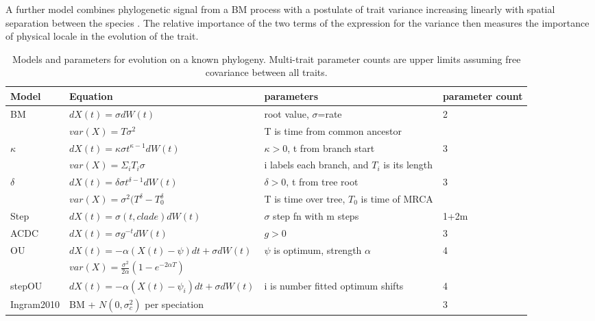 \documentclass[12pt]{article}
\begin{document}
A further model combines phylogenetic signal from a BM process with a postulate of trait variance increasing linearly with spatial separation between the species \citep{freckleton_space_2009}. The relative importance of the two terms of the expression for the variance then measures the importance of physical locale in the evolution of the trait.

\begin{sidewaystable}
\caption{Models and parameters for evolution on a known phylogeny. Multi-trait parameter counts are upper limits assuming free covariance between all traits.}
\begin{tabular}{l l l l}
\hline
Model & Equation & parameters & parameter count 	 \\
\hline
BM              & $dX(t) = \sigma dW(t)$                        & root value, $\sigma$=rate             & 2    		\\ 
		& $var(X) = T \sigma^2$ 			& T is time from common ancestor 	& 		\\
$\kappa$        & $dX(t) = \kappa \sigma t^{\kappa -1} dW(t)$   & $\kappa > 0$, t from branch start     & 3     	\\
		& $var(X) = \Sigma_i T_i \sigma$ 		& i labels each branch, and $T_i$ is its length & 	\\
$\delta$        & $dX(t) = \delta \sigma t^{\delta -1} dW(t)$   & $\delta > 0$, t from tree root        & 3     	\\
		& $var(X) = \sigma^2(T^{\delta} - T_0^{\delta}$ & T is time over tree, $T_0$ is time of MRCA & 		\\ 
Step            & $dX(t) = \sigma(t, clade) dW(t) $             & $\sigma$ step fn with m steps         & 1+2m   	\\
ACDC            & $dX(t) = \sigma g^{-t} dW(t)$                 & $ g > 0 $                             & 3     	\\
OU              & $dX(t) = -\alpha(X(t)-\psi)dt+\sigma dW(t)$    & $\psi$ is optimum, strength $\alpha$  & 4    	\\
		& $var(X) = \frac{\sigma^2}{2\alpha}(1-e^{-2 \alpha T})$ 	& & 					\\
stepOU          & $dX(t) = -\alpha(X(t)-\psi_i)dt+\sigma dW(t)$  & i is number fitted optimum shifts     & 4    	\\
Ingram2010      & BM + $N(0, \sigma^2_c)$ per speciation        &                                       & 3     	\\

\hline
\end{tabular}
\label{tab:label}
\end{sidewaystable}
\end{document}
